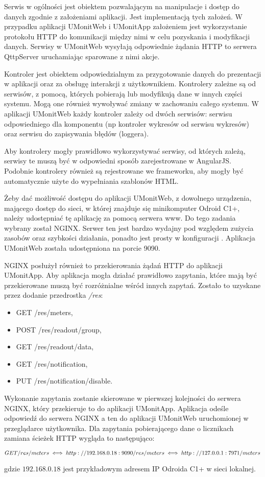Serwis w ogólności jest obiektem pozwalającym na manipulacje i dostęp do danych zgodnie z założeniami aplikacji.
Jest implementacją tych założeń.
W przypadku aplikacji UMonitWeb i UMonitApp założeniem jest wykorzystanie protokołu HTTP do komunikacji między nimi w celu pozyskania i modyfikacji danych.
Serwisy w UMonitWeb wysyłają odpowiednie żądania HTTP to serwera QttpServer uruchamiając sparowane z nimi akcje.

Kontroler jest obiektem odpowiedzialnym za przygotowanie danych do prezentacji w aplikacji oraz za obsługę interakcji z użytkownikiem.
Kontrolery zależne są od serwisów, z pomocą, których pobierają lub modyfikują dane w innych części systemu.
Mogą one również wywoływać zmiany w zachowaniu całego systemu.
W aplikacji UMonitWeb każdy kontroler zależy od dwóch serwisów: serwisu odpowiedniego dla komponentu (np kontroler wykresów od serwisu wykresów) oraz serwisu do zapisywania błędów (loggera).

Aby kontrolery mogły prawidłowo wykorzystywać serwisy, od których zależą, serwisy te muszą być w odpowiedni sposób zarejestrowane w AngularJS.
Podobnie kontrolery również są rejestrowane we frameworku, aby mogły być automatycznie użyte do wypełniania szablonów HTML.

Żeby dać możliwość dostępu do aplikacji UMonitWeb, z dowolnego urządzenia, mającego dostęp do sieci, w której znajduje się minikomputer Odroid C1+, należy udostępniać tę aplikację za pomocą serwera www.
Do tego zadania wybrany został NGINX.
Serwer ten jest bardzo wydajny pod względem zużycia zasobów oraz szybkości działania, ponadto jest prosty w konfiguracji \cite{nginx}.
Aplikacja UMonitWeb została udostępniona na porcie 9090.

NGINX posłużył również to przekierowania żądań HTTP do aplikacji UMonitApp.
Aby aplikacja mogła działać prawidłowo zapytania, które mają być przekierowane muszą być rozróżnialne wśród innych zapytań.
Zostało to uzyskane przez dodanie przedrostka \textit{/res}:
\begin{itemize}
	\itemsep 0em
	\item GET /res/meters,
	\item POST /res/readout/group,
	\item GET /res/readout/data,
	\item GET /res/notification,
	\item PUT /res/notification/disable.
\end{itemize}

Wykonanie zapytania zostanie skierowane w pierwszej kolejności do serwera NGINX, który przekieruje to do aplikacji UMonitApp.
Aplikacja odeśle odpowiedź do serwera NGINX a ten do aplikacji UMonitWeb uruchomionej w przeglądarce użytkownika. Dla zapytania pobierającego dane o licznikach zamiana ścieżek HTTP wygląda to następująco:

\noindent $ GET /res/meters \iff http://192.168.0.18:9090/res/meters \newline \iff http://127.0.0.1:7971/meters $

\noindent gdzie $192.168.0.18$ jest przykładowym adresem IP Odroida C1+ w sieci lokalnej.
